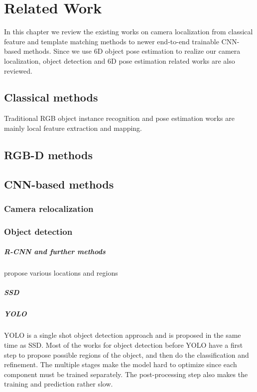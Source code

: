 \chapter{Related Work}

In this chapter we review the existing works on camera localization from classical feature and template matching methods to newer end-to-end trainable CNN-based methods. Since we use 6D object pose estimation to realize our camera localization, object detection and 6D pose estimation related works are also reviewed.

\section{Classical methods}

Traditional RGB object instance recognition and pose estimation works are mainly local feature extraction and mapping.

\section{RGB-D methods}


\section{CNN-based methods}

\subsection{Camera relocalization}

\subsection{Object detection}

\paragraph{R-CNN and further methods}
propose various locations and regions 

\paragraph{SSD}

\paragraph{YOLO}
YOLO is a single shot object detection approach and is proposed in the same time as SSD. Most of the works for object detection before YOLO have a first step to propose possible regions of the object, and then do the classification and refinement. The multiple stages make the model hard to optimize since each component must be trained separately. The post-processing step also makes the training and prediction rather slow.

